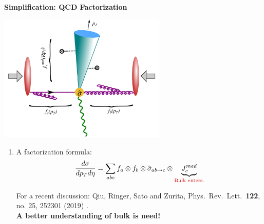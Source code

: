 \documentclass[9pt,a4paper,unknownkeysallowed,xcolor=dvipsnames,aspectratio=43]{beamer}
\begin{document}
\begin{frame}{\bf\huge Simplification: QCD Factorization}	\vspace{4mm}
\begin{center}
\includegraphics[width=0.6\textwidth]{fig/facotrization}\\
\end{center}
\begin{enumerate}
\item{A factorization formula:}
\begin{align}
    \frac{d\sigma}{dp_{T} d\eta} =\sum\limits_{abc}f_a\otimes f_b \otimes \hat{\sigma}_{ab\to c}\otimes \underbrace{J_c^{med}}_{\text{\color{darkred}Bulk enters.}}\notag
\end{align}
\begin{center}
{\tiny  For a recent discussion: {\color{teablue}
  Qiu, Ringer, Sato and Zurita,
  Phys.\ Rev.\ Lett.\  {\bf 122}, no. 25, 252301 (2019)
  .
  }}\\
  \vspace{2mm}
 {\color{darkred}\bf A better understanding of bulk is need!
 }
\end{center}
\end{enumerate}
\end{frame}
%
%
\end{document}
